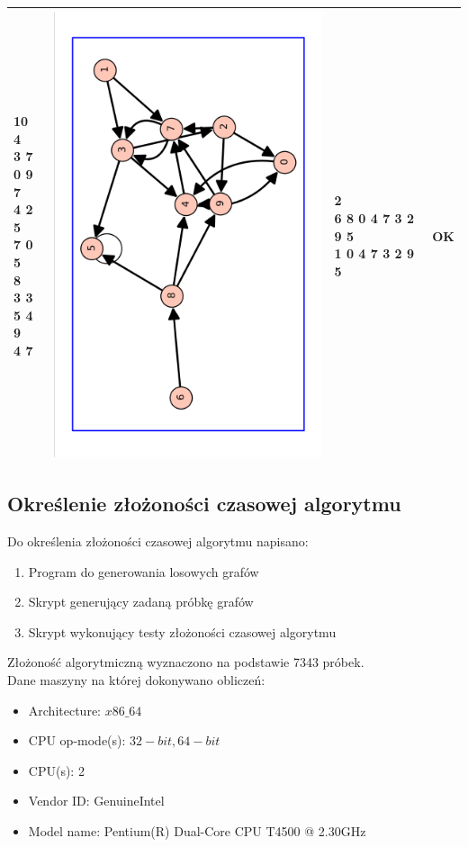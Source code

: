 \documentclass[a4paper,10pt]{article}
\begin{document}
\begin{center}
\begin{tabular}{|l|c|l|l|}
\shortstack[l]{
10\\
4 \\
3 7 \\
0 9 7 \\
4 2 5 \\
7 0 \\
5 \\
8 \\
3 3 \\
5 4 9 \\
4 7 
}
&\includegraphics[width=3 cm]{graph_10_20}&
\shortstack[l]{
2\\
6 8 0 4 7 3 2 9 5 \\
1 0 4 7 3 2 9 5 
}
&OK\\ \hline

\end{tabular}
\end{center}

\subsection{Określenie złożoności czasowej algorytmu}
Do określenia złożoności czasowej algorytmu napisano:

\begin{enumerate}
\item Program do generowania losowych grafów
\item Skrypt generujący zadaną próbkę grafów
\item Skrypt wykonujący testy złożoności czasowej algorytmu
\end{enumerate}

Złożoność algorytmiczną wyznaczono na podstawie 7343 próbek.\\
Dane maszyny na której dokonywano obliczeń:

\begin{itemize}
\item Architecture: $x86\_64$
\item CPU op-mode(s): $32-bit, 64-bit$
\item CPU(s): 2
\item Vendor ID: GenuineIntel
\item Model name: Pentium(R) Dual-Core CPU T4500 @ 2.30GHz
\end{itemize}
\end{document}
